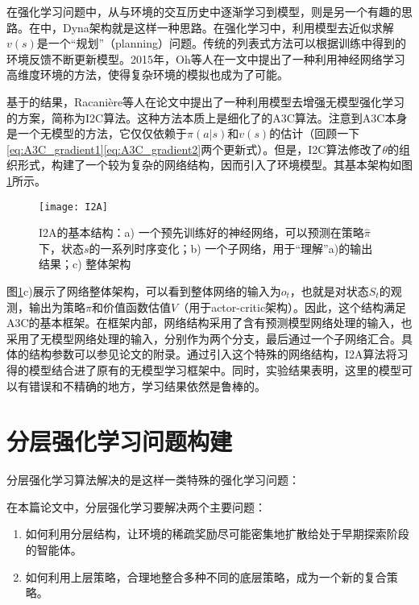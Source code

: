       在强化学习问题中，从与环境的交互历史中逐渐学习到模型，则是另一个有趣的思路。在\cite{Sutton_book}中，Dyna架构就是这样一种思路。在强化学习中，利用模型去近似求解$v(s)$是一个``规划''（planning）问题。传统的列表式方法可以根据训练中得到的环境反馈不断更新模型。2015年，Oh等人在\cite{action-conditional_prediction}一文中提出了一种利用神经网络学习高维度环境的方法，使得复杂环境的模拟也成为了可能。\par 
      基于\cite{action-conditional_prediction}的结果，Racani\`{e}re等人在论文\cite{I2A}中提出了一种利用模型去增强无模型强化学习的方案，简称为I2C算法。这种方法本质上是细化了的A3C算法。注意到A3C本身是一个无模型的方法，它仅仅依赖于$\pi(a|s)$和$v(s)$的估计（回顾一下\eqref{eq:A3C_gradient1}\eqref{eq:A3C_gradient2}两个更新式）。但是，I2C算法修改了$\theta$的组织形式，构建了一个较为复杂的网络结构，因而引入了环境模型。其基本架构如图\ref{fig:I2A}所示。
      \begin{figure}[H] %
        \centering
        \texttt{[image: I2A]}
        \caption{I2A的基本结构：a) 一个预先训练好的神经网络，可以预测在策略$\hat{\pi}$下，状态$s$的一系列时序变化；b) 一个子网络，用于``理解''a)的输出结果；c) 整体架构}
        \label{fig:I2A}
      \end{figure}
      \par 图\ref{fig:I2A}c)展示了网络整体架构，可以看到整体网络的输入为$o_t$，也就是对状态$S_t$的观测，输出为策略$\pi$和价值函数估值$V$（用于actor-critic架构）。因此，这个结构满足A3C的基本框架。在框架内部，网络结构采用了含有预测模型网络处理的输入，也采用了无模型网络处理的输入，分别作为两个分支，最后通过一个子网络汇合。具体的结构参数可以参见论文\cite{I2A}的附录。通过引入这个特殊的网络结构，I2A算法将习得的模型结合进了原有的无模型学习框架中。同时，实验结果表明，这里的模型可以有错误和不精确的地方，学习结果依然是鲁棒的。
    
\section{分层强化学习问题构建}
分层强化学习算法解决的是这样一类特殊的强化学习问题：

在本篇论文中，分层强化学习要解决两个主要问题：
\begin{enumerate}
  \item 如何利用分层结构，让环境的稀疏奖励尽可能密集地扩散给处于早期探索阶段的智能体。
  \item 如何利用上层策略，合理地整合多种不同的底层策略，成为一个新的复合策略。
\end{enumerate}

